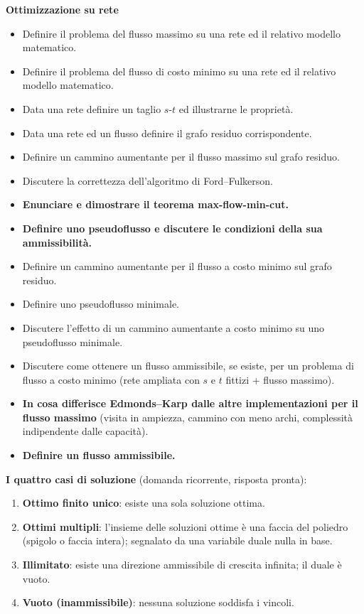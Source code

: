 \documentclass[11pt,a4paper]{article}
\begin{document}
\textbf{Ottimizzazione su rete}
\begin{itemize}[itemsep=0.15em]
\item Definire il problema del flusso massimo su una rete ed il relativo modello matematico.
\item Definire il problema del flusso di costo minimo su una rete ed il relativo modello matematico.
\item Data una rete definire un taglio $s$-$t$ ed illustrarne le proprietà.
\item Data una rete ed un flusso definire il grafo residuo corrispondente.
\item Definire un cammino aumentante per il flusso massimo sul grafo residuo.
\item Discutere la correttezza dell'algoritmo di Ford--Fulkerson.
\item \textbf{Enunciare e dimostrare il teorema max-flow-min-cut.}
\item \textbf{Definire uno pseudoflusso e discutere le condizioni della sua ammissibilità.}
\item Definire un cammino aumentante per il flusso a costo minimo sul grafo residuo.
\item Definire uno pseudoflusso minimale.
\item Discutere l'effetto di un cammino aumentante a costo minimo su uno pseudoflusso minimale.
\item Discutere come ottenere un flusso ammissibile, se esiste, per un problema di flusso
      a costo minimo (rete ampliata con $s$ e $t$ fittizi + flusso massimo).
\item \textbf{In cosa differisce Edmonds--Karp dalle altre implementazioni per il flusso massimo}
      (visita in ampiezza, cammino con meno archi, complessità indipendente dalle capacità).
\item \textbf{Definire un flusso ammissibile.}
\end{itemize}

\textbf{I quattro casi di soluzione} (domanda ricorrente, risposta pronta):
\begin{enumerate}[itemsep=0.15em]
\item \textbf{Ottimo finito unico}: esiste una sola soluzione ottima.
\item \textbf{Ottimi multipli}: l'insieme delle soluzioni ottime è una faccia del poliedro
      (spigolo o faccia intera); segnalato da una variabile duale nulla in base.
\item \textbf{Illimitato}: esiste una direzione ammissibile di crescita infinita;
      il duale è vuoto.
\item \textbf{Vuoto (inammissibile)}: nessuna soluzione soddisfa i vincoli.
\end{enumerate}
\end{document}
